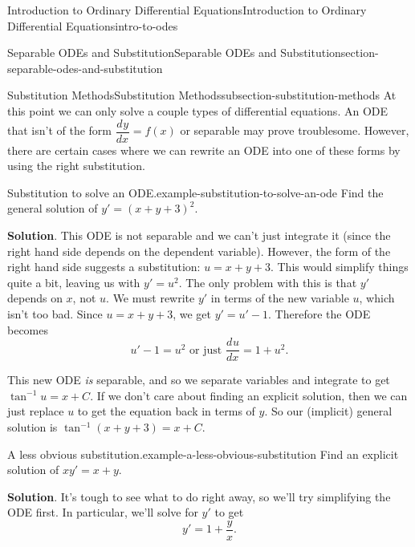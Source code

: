 \documentclass[oneside,10pt,]{book}
\numberwithin{equation}{section}
\newcommand{\dv}[3][]{\dfrac{d^{#1} #2}{d #3^{#1}}}
\begin{document}
\begin{chapterptx}{Introduction to Ordinary Differential Equations}{}{Introduction to Ordinary Differential Equations}{}{}{intro-to-odes}
\begin{sectionptx}{Separable ODEs and Substitution}{}{Separable ODEs and Substitution}{}{}{section-separable-odes-and-substitution}
%
\typeout{************************************************}
\typeout{************************************************}
%
\begin{subsectionptx}{Substitution Methods}{}{Substitution Methods}{}{}{subsection-substitution-methods}
\hypertarget{p-62}{}%
At this point we can only solve a couple types of differential equations. An ODE that isn't of the form \(\dv{y}{x} = f(x)\) or separable may prove troublesome. However, there are certain cases where we can rewrite an ODE into one of these forms by using the right substitution.%
\begin{example}{Substitution to solve an ODE.}{example-substitution-to-solve-an-ode}%
\hypertarget{p-63}{}%
Find the general solution of \(y' = (x+y+3)^{2}\).%
\par\smallskip%
\noindent\textbf{Solution}.\hypertarget{solution-11}{}\quad%
\hypertarget{p-64}{}%
This ODE is not separable and we can't just integrate it (since the right hand side depends on the dependent variable). However, the form of the right hand side suggests a substitution: \(u = x+y+3\). This would simplify things quite a bit, leaving us with \(y'=u^{2}\). The only problem with this is that \(y'\) depends on \(x\), not \(u\). We must rewrite \(y'\) in terms of the new variable \(u\), which isn't too bad. Since \(u = x+y+3\), we get \(y' = u'-1\). Therefore the ODE becomes%
\begin{equation*}
u'-1 = u^{2}\text{ or just }\dv{u}{x} = 1+u^{2}.
\end{equation*}
%
\par
\hypertarget{p-65}{}%
This new ODE \emph{is} separable, and so we separate variables and integrate to get \(\tan^{-1}u = x+C\). If we don't care about finding an explicit solution, then we can just replace \(u\) to get the equation back in terms of \(y\). So our (implicit) general solution is \(\tan^{-1}(x+y+3) = x+C\).%
\end{example}
\begin{example}{A less obvious substitution.}{example-a-less-obvious-substitution}%
\hypertarget{p-66}{}%
Find an explicit solution of \(xy'=x+y\).%
\par\smallskip%
\noindent\textbf{Solution}.\hypertarget{solution-12}{}\quad%
\hypertarget{p-67}{}%
It's tough to see what to do right away, so we'll try simplifying the ODE first. In particular, we'll solve for \(y'\) to get%
\begin{equation*}
y' = 1+\frac{y}{x}.
\end{equation*}

\end{example}
\end{subsectionptx}
\end{sectionptx}
\end{chapterptx}
\end{document}

